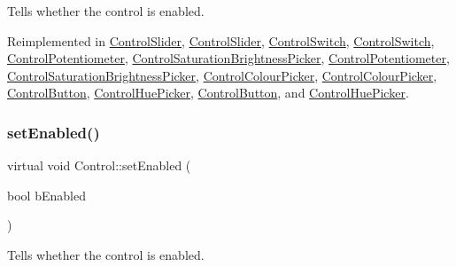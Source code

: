 Tells whether the control is enabled. 

Reimplemented in \hyperlink{classControlSlider_ad02c5f0f4382a9780f215e3568757c2b}{Control\+Slider}, \hyperlink{classControlSlider_aeb98aed4fbd48f28c55ac6eb7ffd9b30}{Control\+Slider}, \hyperlink{classControlSwitch_a47191d986db5cb5c95a7b2171d483784}{Control\+Switch}, \hyperlink{classControlSwitch_a6e27f98a50b25ba395f2ad7a5c1aa59f}{Control\+Switch}, \hyperlink{classControlPotentiometer_ac67b583a3a21f6c44ffcf57b41c33278}{Control\+Potentiometer}, \hyperlink{classControlSaturationBrightnessPicker_a4b71c4cd73bbe398460360121e88e657}{Control\+Saturation\+Brightness\+Picker}, \hyperlink{classControlPotentiometer_ac67b583a3a21f6c44ffcf57b41c33278}{Control\+Potentiometer}, \hyperlink{classControlSaturationBrightnessPicker_af272e7bef89c1bcf19354bfaa76ebcb2}{Control\+Saturation\+Brightness\+Picker}, \hyperlink{classControlColourPicker_a233d6048e0899b35f23aaa557a839069}{Control\+Colour\+Picker}, \hyperlink{classControlColourPicker_ac332c171d8aa481120139479c78da22b}{Control\+Colour\+Picker}, \hyperlink{classControlButton_ac3515c2c94586676696d73d48e5ab08f}{Control\+Button}, \hyperlink{classControlHuePicker_a2e6169e815f3ee9fa83f00f9e20f7292}{Control\+Hue\+Picker}, \hyperlink{classControlButton_ab8b40e3ef7dccccc2b2029c5ae113962}{Control\+Button}, and \hyperlink{classControlHuePicker_a45c6330610f27124057f4d69b37abc9b}{Control\+Hue\+Picker}.

\mbox{\label{classControl_acf90798c4ddf200abae8b909c029c7ab}} 
\subsubsection{\texorpdfstring{set\+Enabled()}{setEnabled()}\hspace{0.1cm}{\footnotesize\ttfamily [2/2]}}
{\footnotesize\ttfamily virtual void Control\+::set\+Enabled (\begin{DoxyParamCaption}\item[{bool}]{b\+Enabled }\end{DoxyParamCaption})\hspace{0.3cm}{\ttfamily [virtual]}}

Tells whether the control is enabled. 

